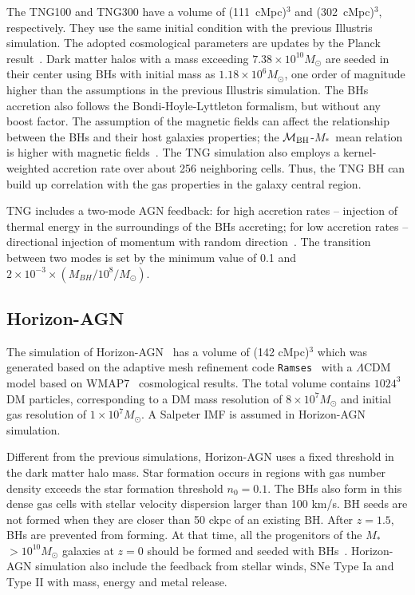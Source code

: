 \documentclass[twocolumn]{aastex631}
\def\smass{{$M_*$}}
\def\mbh{$\mathcal M_{\rm BH}$}
\begin{document}
The TNG100 and TNG300 have a volume of (111~cMpc)$^3$ and (302~cMpc)$^3$, respectively. They use the same initial condition with the previous Illustris simulation. The adopted cosmological parameters are updates by the Planck result~\citep{2016A&A...594A..13P}.
Dark matter halos with a mass exceeding $7.38 \times 10^{10} M_{\odot}$ are seeded in their center using BHs with initial mass as $1.18 \times 10^6 M_{\odot}$, one order of magnitude higher than the assumptions in the previous Illustris simulation. The BHs accretion also follows the Bondi-Hoyle-Lyttleton formalism, but without any boost factor. The assumption of the magnetic fields can affect the relationship between the BHs and their host galaxies properties; the \mbh-\smass\ mean relation is higher with magnetic fields~\citep{2018MNRAS.473.4077P}. The TNG simulation also employs a kernel-weighted accretion rate over about 256 neighboring cells. Thus, the TNG BH can build up correlation with the gas properties in the galaxy central region.

TNG includes a two-mode AGN feedback: for high accretion rates -- injection of thermal energy in the surroundings of the BHs accreting; for low accretion rates -- directional injection of momentum with random direction~\citep{2017MNRAS.465.3291W, 2018MNRAS.479.4056W}. The transition between two modes is set by the minimum value of 0.1 and $2 \times 10 ^{-3} \times (M_{BH} / 10^8/M_{\odot})$.

\subsection{Horizon-AGN}
The simulation of Horizon-AGN~\citep{2014MNRAS.444.1453D, 2016MNRAS.463.3948D} has a volume of (142 cMpc)$^3$ which was generated based on the adaptive mesh refinement code {\tt Ramses}~\citep{2002A&A...385..337T} with a $\Lambda$CDM model based on WMAP7~\citep{2011ApJS..192...18K} cosmological results. The total volume contains $1024^3$ DM particles, corresponding to a DM mass resolution of $8 \times 10^7  M_{\odot}$  and initial gas resolution of  $1\times10^7M_{\odot}$. A Salpeter IMF is assumed in Horizon-AGN simulation.

Different from the previous simulations, Horizon-AGN uses a fixed threshold in the dark matter halo mass. Star formation occurs in regions with gas number density exceeds the star formation threshold $n_0 = 0.1$. The BHs also form in this dense gas cells with stellar velocity dispersion larger than 100 km/s. BH seeds are not formed when they are closer than 50 ckpc of an existing BH. After $z = 1.5$, BHs are prevented from forming. At that time, all the progenitors of the \smass$>10^{10} M_{\odot}$ galaxies at $z = 0$ should be formed and seeded with BHs~\citep{2016MNRAS.460.2979V}. Horizon-AGN simulation also include the feedback from stellar winds, SNe Type Ia and Type II with mass, energy and metal release.
\end{document}
